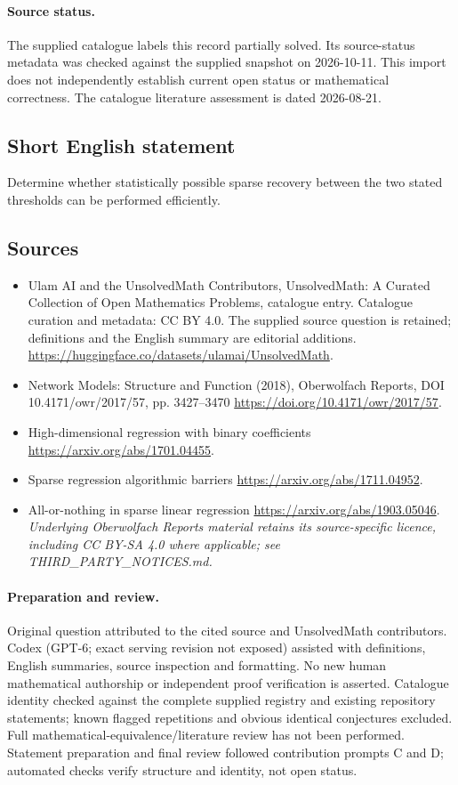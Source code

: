 \documentclass[11pt]{article}
\begin{document}
\paragraph{Source status.}
The supplied catalogue labels this record partially solved. Its source-status metadata was checked against the supplied snapshot on 2026-10-11. This import does not independently establish current open status or mathematical correctness. The catalogue literature assessment is dated 2026-08-21.
\subsection{Short English statement}
Determine whether statistically possible sparse recovery between the two stated thresholds can be performed efficiently.
\subsection{Sources}
\begin{itemize}
\item[\hypertarget{source:statement:1}{S1}] Ulam AI and the UnsolvedMath Contributors, UnsolvedMath: A Curated Collection of Open Mathematics Problems, catalogue entry. Catalogue curation and metadata: CC BY 4.0. The supplied source question is retained; definitions and the English summary are editorial additions.
\url{https://huggingface.co/datasets/ulamai/UnsolvedMath}.
\item[\hypertarget{source:statement:2}{S2}] Network Models: Structure and Function (2018), Oberwolfach Reports, DOI 10.4171/owr/2017/57, pp. 3427--3470
\url{https://doi.org/10.4171/owr/2017/57}.
\item[\hypertarget{source:statement:3}{S3}] High-dimensional regression with binary coefficients
\url{https://arxiv.org/abs/1701.04455}.
\item[\hypertarget{source:statement:4}{S4}] Sparse regression algorithmic barriers
\url{https://arxiv.org/abs/1711.04952}.
\item[\hypertarget{source:statement:5}{S5}] All-or-nothing in sparse linear regression
\url{https://arxiv.org/abs/1903.05046}.
\textit{Underlying Oberwolfach Reports material retains its source-specific licence, including CC BY-SA 4.0 where applicable; see THIRD\_PARTY\_NOTICES.md.}
\end{itemize}
\paragraph{Preparation and review.}
Original question attributed to the cited source and UnsolvedMath contributors. Codex (GPT-6; exact serving revision not exposed) assisted with definitions, English summaries, source inspection and formatting. No new human mathematical authorship or independent proof verification is asserted. Catalogue identity checked against the complete supplied registry and existing repository statements; known flagged repetitions and obvious identical conjectures excluded. Full mathematical-equivalence/literature review has not been performed. Statement preparation and final review followed contribution prompts C and D; automated checks verify structure and identity, not open status.
\label{end:statement}
\end{document}
